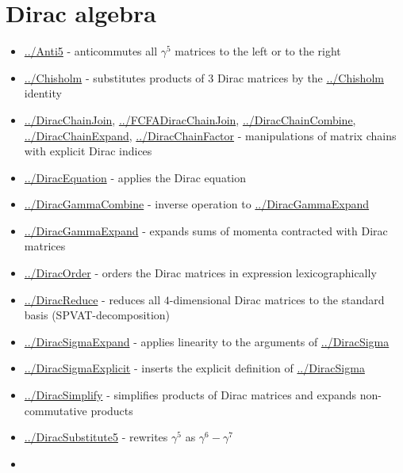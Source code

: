\documentclass[../FeynCalcManual.tex]{subfiles}
\begin{document}
\hypertarget{dirac algebra}{
\section{Dirac algebra}\label{dirac algebra}}

\begin{itemize}
\tightlist
\item
  \hyperlink{../anti5}{../Anti5} - anticommutes all \(\gamma^5\)
  matrices to the left or to the right
\item
  \hyperlink{../chisholm}{../Chisholm} - substitutes products of \(3\)
  Dirac matrices by the \hyperlink{../chisholm}{../Chisholm} identity
\item
  \hyperlink{../diracchainjoin}{../DiracChainJoin},
  \hyperlink{../fcfadiracchainjoin}{../FCFADiracChainJoin},
  \hyperlink{../diracchaincombine}{../DiracChainCombine},
  \hyperlink{../diracchainexpand}{../DiracChainExpand},
  \hyperlink{../diracchainfactor}{../DiracChainFactor} - manipulations
  of matrix chains with explicit Dirac indices
\item
  \hyperlink{../diracequation}{../DiracEquation} - applies the Dirac
  equation
\item
  \hyperlink{../diracgammacombine}{../DiracGammaCombine} - inverse
  operation to \hyperlink{../diracgammaexpand}{../DiracGammaExpand}
\item
  \hyperlink{../diracgammaexpand}{../DiracGammaExpand} - expands sums of
  momenta contracted with Dirac matrices
\item
  \hyperlink{../diracorder}{../DiracOrder} - orders the Dirac matrices
  in expression lexicographically
\item
  \hyperlink{../diracreduce}{../DiracReduce} - reduces all
  \(4\)-dimensional Dirac matrices to the standard basis
  (SPVAT-decomposition)
\item
  \hyperlink{../diracsigmaexpand}{../DiracSigmaExpand} - applies
  linearity to the arguments of \hyperlink{../diracsigma}{../DiracSigma}
\item
  \hyperlink{../diracsigmaexplicit}{../DiracSigmaExplicit} - inserts the
  explicit definition of \hyperlink{../diracsigma}{../DiracSigma}
\item
  \hyperlink{../diracsimplify}{../DiracSimplify} - simplifies products
  of Dirac matrices and expands non-commutative products
\item
  \hyperlink{../diracsubstitute5}{../DiracSubstitute5} - rewrites
  \(\gamma^5\) as \(\gamma^6-\gamma^7\)
\item

\end{itemize}
\end{document}
